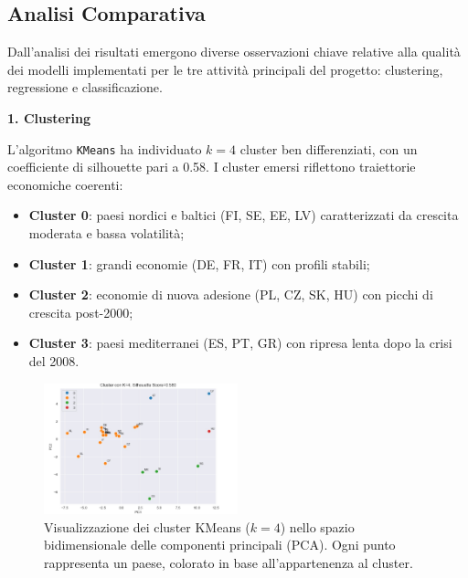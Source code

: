 \documentclass[conference]{IEEEtran}
\begin{document}
\begin{itemize}
\section*{\Large \textbf{Analisi Comparativa}}

Dall’analisi dei risultati emergono diverse osservazioni chiave relative alla qualità dei modelli implementati per le tre attività principali del progetto: clustering, regressione e classificazione.

\noindent\textbf{1. Clustering}

L’algoritmo \texttt{KMeans} ha individuato $k = 4$ cluster ben differenziati, con un coefficiente di silhouette pari a 0.58. I cluster emersi riflettono traiettorie economiche coerenti:

\begin{itemize}
  \item \textbf{Cluster 0}: paesi nordici e baltici (FI, SE, EE, LV) caratterizzati da crescita moderata e bassa volatilità;
  \item \textbf{Cluster 1}: grandi economie (DE, FR, IT) con profili stabili;
  \item \textbf{Cluster 2}: economie di nuova adesione (PL, CZ, SK, HU) con picchi di crescita post-2000;
  \item \textbf{Cluster 3}: paesi mediterranei (ES, PT, GR) con ripresa lenta dopo la crisi del 2008.
\end{itemize}
\begin{figure}[H]
\centering
\includegraphics[width=0.5\textwidth]{Kmeans.png}
\caption{Visualizzazione dei cluster KMeans ($k=4$) nello spazio bidimensionale delle componenti principali (PCA). Ogni punto rappresenta un paese, colorato in base all’appartenenza al cluster.}
\label{fig:kmeans-cluster-map}
\end{figure}




\end{itemize}
\end{document}
